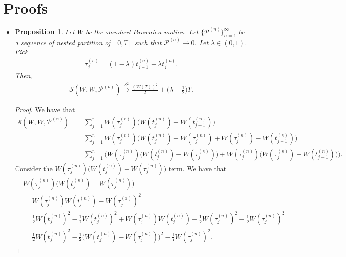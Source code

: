 \documentclass[10pt]{article}
\newtheorem{proposition}[lemma]{Proposition}
\newcommand{\mcal}[1]{\mathcal{#1}}
\begin{document}
\appendix

\section{Proofs}

\begin{itemize}
  \item \begin{proposition} \label{thm:w-dw-integral}
    Let $W$ be the standard Brownian motion. Let $\{ \mcal{P}^{(n)} \}_{n=1}^\infty$ be a sequence of nested partition of $[0,T]$ such that $\mcal{P}^{(n)} \rightarrow 0$. Let $\lambda \in (0,1)$. Pick 
    \begin{align*}
      \tau_{j}^{(n)} = (1-\lambda) t_{j-1}^{(n)} + \lambda t_{j}^{(n)}.
    \end{align*}
    Then,
    \begin{align*}      
      \mcal{S}(W, W, \mcal{P}^{(n)}) \xrightarrow[]{\mcal{L}^2} \frac{(W(T))^2}{2} + \bigg( \lambda - \frac{1}{2} \bigg) T.
    \end{align*}    
  \end{proposition}
  \begin{proof}
    We have that
    \begin{align*}
      \mcal{S}(W,W,\mcal{P}^{(n)})
      &= \sum_{j=1}^n W(\tau_j^{(n)}) \Big( W(t_{j}^{(n)}) - W(t_{j-1}^{(n)})\Big) \\
      &= \sum_{j=1}^n W(\tau_j^{(n)}) \Big( W(t_{j}^{(n)}) - W(\tau_j^{(n)}) + W(\tau_j^{(n)}) - W(t_{j-1}^{(n)})\Big) \\
      &= \sum_{j=1}^n \bigg( W(\tau_j^{(n)}) \Big( W(t_{j}^{(n)}) - W(\tau_j^{(n)}) \Big) + W(\tau_j^{(n)}) \Big( W(\tau_j^{(n)}) - W(t_{j-1}^{(n)})\Big) \bigg).
    \end{align*}
    Consider the $W(\tau_j^{(n)}) \Big( W(t_{j}^{(n)}) - W(\tau_j^{(n)}) \Big)$ term. We have that
    \begin{align*}
      & W(\tau_j^{(n)}) \Big( W(t_{j}^{(n)}) - W(\tau_j^{(n)}) \Big) \\
      &= W(\tau_j^{(n)})W(t_{j}^{(n)}) - W(\tau_j^{(n)})^2 \\
      &= \frac{1}{2} W(t^{(n)}_j)^2 - \frac{1}{2} W(t^{(n)}_j)^2 + W(\tau_j^{(n)})W(t_{j}^{(n)}) - \frac{1}{2} W(\tau_j^{(n)})^2 - \frac{1}{2} W(\tau_j^{(n)})^2 \\
      &= \frac{1}{2} W(t^{(n)}_j)^2 - \frac{1}{2}\Big( W(t^{(n)}_j) - W(\tau^{(n)}_j )\Big)^2 - \frac{1}{2} W(\tau^{(n)}_j)^2.
    \end{align*}

\end{proof}
\end{itemize}
\end{document}
